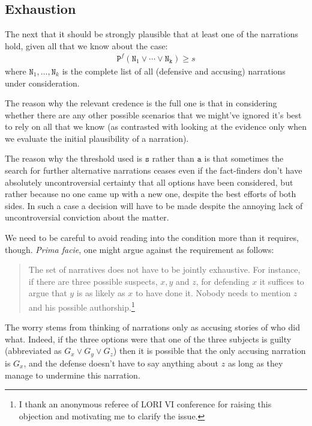 \documentclass[10pt,leqno]{article}
\begin{document}
\subsection{Exhaustion}

The next  that it should be strongly plausible that at least one of the narrations hold, given all that we know about the case:
\begin{align}
\tag{Exhaustion} \label{Exhaustion} \mathtt{P}^f( \mathtt{N}_1\vee \cdots \vee  \mathtt{N_k}) \geq s 
\end{align}
\noindent where $\mathtt{N}_1, \dots, \mathtt{N}_k$ is the complete list of all (defensive and accusing)  narrations  under consideration.

The reason why the relevant credence is the full one is that in considering whether there are any other possible scenarios that we might've ignored it's best to rely on all that we know (as contrasted with looking at the evidence only when we evaluate the initial plausibility of a narration).

The reason why the threshold used is $\mathtt{s}$ rather than $\mathtt{a}$ is that sometimes the search for further alternative narrations ceases even if the fact-finders don't have absolutely uncontroversial certainty that all options have been considered, but rather because no one came up with a new one, despite the best efforts of both sides. In such a case a decision will have to be made despite the annoying lack of uncontroversial conviction about the matter.


We need to be careful to  avoid reading into the condition more than it requires, though. \emph{Prima facie}, one might argue against the requirement as follows:
\begin{quote}
 The set of narratives does not have to be jointly exhaustive. For instance, if there are three possible suspects, $x,y$ and $z$, for defending $x$ it suffices to argue that $y$ is as likely as $x$ to have done it. Nobody needs to mention $z$ and his possible authorship.\footnote{I thank an anonymous referee of LORI VI conference for raising this objection and motivating me to clarify the issue.}
\end{quote}


The worry stems from thinking of narrations only as accusing stories of who did what. Indeed, if the three options were that one of the three subjects is guilty (abbreviated as $G_x\vee G_y \vee G_z$) then it is possible that the only accusing narration is $G_x$, and the defense doesn't have to say anything about $z$ as long as they manage to undermine this narration. 
\end{document}
